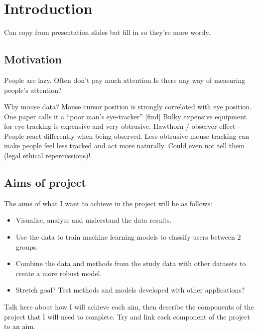 \documentclass{article}
\begin{document}

\section{Introduction}
Can copy from presentation slides but fill in so they're more wordy.

\subsection{Motivation}

People are lazy. 
Often don't pay much attention 
Is there any way of measuring people's attention?

Why mouse data?
Mouse cursor position is strongly correlated with eye position. 
One paper calls it a “poor man's eye-tracker” [find]
Bulky expensive equipment for eye tracking is expensive and very obtrusive.
Hawthorn / observer effect - People react differently when being observed. 
Less obtrusive mouse tracking can make people feel less tracked and act more naturally. 
Could even not tell them (legal ethical repercussions)!

\subsection{Aims of project}

The aims of what I want to achieve in the project will be as follows:
\begin{itemize}
    \item Visualise, analyse and understand the data results.
    \item Use the data to train machine learning models to classify users between 2 groups.
    \item Combine the data and methods from the study data with other datasets to create a more robust model.
    \item Stretch goal? Test methods and models developed with other applications?
\end{itemize}

Talk here about how I will achieve each aim, then describe the components of the project that I will need to complete.
Try and link each component of the project to an aim.
\end{document}
